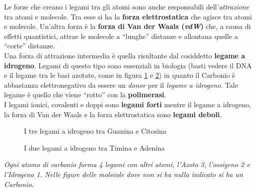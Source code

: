 \documentclass[a4paper,12pt, oneside]{book}
\begin{document}
Le forze che creano i legami tra gli atomi sono anche responsabili
dell'\textit{attrazione} tra atomi e molecole. Tra esse si ha la \textbf{forza
  elettrostatica} che agisce tra atomi e molecole. Un'altra forza è la
\textbf{forza di Van der Waals (\textit{vdW})} che, a causa di effetti
quantistici, attrae le molecole a ``lunghe'' distanze e allontana quelle a
``corte'' distanze. \\
Una forza di attrazione intermedia è quella risultante dal cosiddetto
\textbf{legame a idrogeno}. Legami di questo tipo sono essenziali in biologia
(basti vedere il DNA e il legame tra le basi azotate, come in figura
\ref{fig:hyd} e \ref{fig:hyd2}) in quanto il Carbonio è abbastanza
elettronegativo da essere un \textit{donor} per il \textit{legame a
  idrogeno}. Tale legame è quello che viene ``rotto'' con la
\textbf{polimerasi}.\\ 
I legami ionici, covalenti e doppi sono \textbf{legami forti} mentre il legame a
idrogeno, la forza di Van der Waals e la forza elettrostatica sono
\textbf{legami deboli}.\\
\begin{figure}
  \centering
  \qquad
  \caption{I tre legami a idrogeno tra Guanina e Citosina}
  \label{fig:hyd}
\end{figure}
\begin{figure}
  \centering
  \qquad
  \caption{I due legami a idrogeno tra Timina e Adenina}
  \label{fig:hyd2}
\end{figure}
\textit{Ogni atomo di carbonio forma 4 legami con altri atomi,
  l'Azoto 3, l'ossigeno 2 e l'Idrogeno 1. Nelle figure delle molecole dove non
si ha nulla indicato si ha un Carbonio.}
\end{document}
